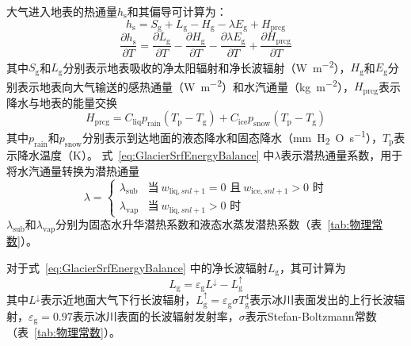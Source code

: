 大气进入地表的热通量$h_{\mathrm {s}} $和其偏导可计算为：
\begin{equation}\label{eq:GlacierSrfEnergyBalance}
  h_{\mathrm {s}}  = S_{\mathrm {g}}  + L_{\mathrm {g}}  - H_{\mathrm {g}}  - \lambda E_{\mathrm {g}}  + H_{\mathrm{prcg}}
\end{equation}
\begin{equation}
  \frac{\partial h_{\mathrm {s}} }{\partial T} = \frac{\partial L_{\mathrm {g}} }{\partial T} -\frac{\partial H_{\mathrm {g}} }{\partial T} -\frac{\partial \lambda E_{\mathrm {g}} }{\partial T} +\frac{\partial H_{\mathrm{prcg}}}{\partial T}
\end{equation}
其中$S_{\mathrm {g}} $和$L_{\mathrm {g}} $分别表示地表吸收的净太阳辐射和净长波辐射（\unit{W.m^{-2}}），$H_{\mathrm {g}} $和$E_{\mathrm {g}} $分别表示地表向大气输送的感热通量（\unit{W.m^{-2}}）和水汽通量（\unit{kg.m^{-2}}），$H_{\mathrm{prcg}}$表示降水与地表的能量交换
\begin{equation}
  H_{\mathrm{prcg}} = C_{\mathrm{liq}}p_{\mathrm {rain}} \left(T_{\mathrm {p}} -T_{\mathrm {g}} \right) + C_{\mathrm{ice}}p_{\mathrm {snow}} \left(T_{\mathrm {p}} -T_{\mathrm {g}} \right)
\end{equation}
其中$p_{\mathrm {rain}} $和$p_{\mathrm {snow}} $分别表示到达地面的液态降水和固态降水（\unit{mm.H_2O.s^{-1}}），$T_{\mathrm {p}} $表示降水温度（K）。
式~\eqref{eq:GlacierSrfEnergyBalance} 中$\lambda$表示潜热通量系数，用于将水汽通量转换为潜热通量
\begin{equation}
  \lambda = \begin{cases}
    \lambda_{\mathrm {sub}}  &\text{当}\ w_{\mathrm{liq},snl+1}=0\text{ 且}\ w_{\mathrm{ice},snl+1}>0\text{ 时}\\
    \lambda_{\mathrm {vap}}  &\text{当}\ w_{\mathrm{liq},snl+1}>0\text{ 时}
  \end{cases}
\end{equation}
$\lambda_{\mathrm {sub}} $和$\lambda_{\mathrm {vap}} $分别为固态水升华潜热系数和液态水蒸发潜热系数（表~\ref{tab:物理常数}）。

对于式~\eqref{eq:GlacierSrfEnergyBalance} 中的净长波辐射$L_{\mathrm {g}} $，其可计算为
\begin{equation}
  L_{\mathrm {g}}  = \varepsilon_{\mathrm {g}}  L ^\downarrow - L_{\mathrm {g}} ^\uparrow
\end{equation}
其中$L^ \downarrow$表示近地面大气下行长波辐射，$L_{\mathrm {g}} ^\uparrow=\varepsilon_{\mathrm {g}} \sigma T^4_{\mathrm {g}} $表示冰川表面发出的上行长波辐射，$\varepsilon_{\mathrm {g}} =0.97$表示冰川表面的长波辐射发射率，$\sigma$表示Stefan-Boltzmann常数（表~\ref{tab:物理常数}）。

